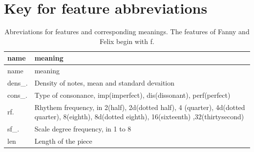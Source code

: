 \documentclass[12pt,twoside]{reedthesis}
\theoremstyle{definition}
\theoremstyle{definition}
\theoremstyle{definition}
\theoremstyle{remark}
\begin{document}
\section{Key for feature
abbreviations}\label{key-for-feature-abbreviations}
\begin{longtable}[]{@{}ll@{}}
\caption{Abreviations for features and corresponding meanings. The
features of Fanny and Felix begin with f.}\tabularnewline
\toprule
\begin{minipage}[b]{0.11\columnwidth}\raggedright\strut
name\strut
\end{minipage} & \begin{minipage}[b]{0.83\columnwidth}\raggedright\strut
meaning\strut
\end{minipage}\tabularnewline
\midrule
\endfirsthead
\toprule
\begin{minipage}[b]{0.11\columnwidth}\raggedright\strut
name\strut
\end{minipage} & \begin{minipage}[b]{0.83\columnwidth}\raggedright\strut
meaning\strut
\end{minipage}\tabularnewline
\midrule
\endhead
\begin{minipage}[t]{0.11\columnwidth}\raggedright\strut
dens\_.\strut
\end{minipage} & \begin{minipage}[t]{0.83\columnwidth}\raggedright\strut
Density of notes, mean and standard devaition\strut
\end{minipage}\tabularnewline
\begin{minipage}[t]{0.11\columnwidth}\raggedright\strut
cons\_.\strut
\end{minipage} & \begin{minipage}[t]{0.83\columnwidth}\raggedright\strut
Type of consonance, imp(imperfect), dis(dissonant), perf(perfect)\strut
\end{minipage}\tabularnewline
\begin{minipage}[t]{0.11\columnwidth}\raggedright\strut
rf.\strut
\end{minipage} & \begin{minipage}[t]{0.83\columnwidth}\raggedright\strut
Rhythem frequency, in 2(half), 2d(dotted half), 4 (quarter), 4d(dotted
quarter), 8(eighth), 8d(dotted eighth), 16(sixteenth)
,32(thirtysecond)\strut
\end{minipage}\tabularnewline
\begin{minipage}[t]{0.11\columnwidth}\raggedright\strut
sf\_.\strut
\end{minipage} & \begin{minipage}[t]{0.83\columnwidth}\raggedright\strut
Scale degree frequency, in 1 to 8\strut
\end{minipage}\tabularnewline
\begin{minipage}[t]{0.11\columnwidth}\raggedright\strut
len\strut
\end{minipage} & \begin{minipage}[t]{0.83\columnwidth}\raggedright\strut
Length of the piece\strut
\end{minipage}\tabularnewline
\bottomrule
\end{longtable}
\end{document}
